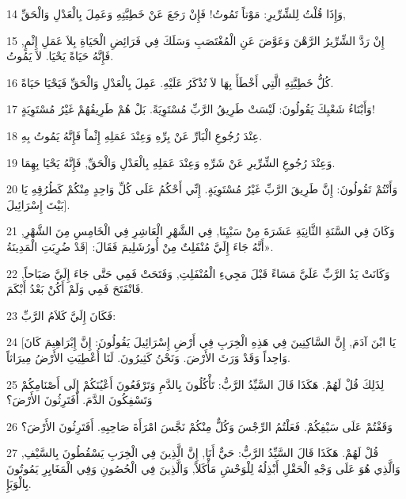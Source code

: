 \par 14 وَإِذَا قُلْتُ لِلشِّرِّيرِ: مَوْتاً تَمُوتُ! فَإِنْ رَجَعَ عَنْ خَطِيَّتِهِ وَعَمِلَ بِالْعَدْلِ وَالْحَقِّ,
\par 15 إِنْ رَدَّ الشِّرِّيرُ الرَّهْنَ وَعَوَّضَ عَنِ الْمُغْتَصَبِ وَسَلَكَ فِي فَرَائِضِ الْحَيَاةِ بِلاَ عَمَلِ إِثْمٍ, فَإِنَّهُ حَيَاةً يَحْيَا. لاَ يَمُوتُ.
\par 16 كُلُّ خَطِيَّتِهِ الَّتِي أَخْطَأَ بِهَا لاَ تُذْكَرُ عَلَيْهِ. عَمِلَ بِالْعَدْلِ وَالْحَقِّ فَيَحْيَا حَيَاةً.
\par 17 وَأَبْنَاءُ شَعْبِكَ يَقُولُونَ: لَيْسَتْ طَرِيقُ الرَّبِّ مُسْتَوِيَةً. بَلْ هُمْ طَرِيقُهُمْ غَيْرُ مُسْتَوِيَةٍ!
\par 18 عِنْدَ رُجُوعِ الْبَارِّ عَنْ بِرِّهِ وَعِنْدَ عَمَلِهِ إِثْماً فَإِنَّهُ يَمُوتُ بِهِ.
\par 19 وَعِنْدَ رُجُوعِ الشِّرِّيرِ عَنْ شَرِّهِ وَعِنْدَ عَمَلِهِ بِالْعَدْلِ وَالْحَقِّ, فَإِنَّهُ يَحْيَا بِهِمَا.
\par 20 وَأَنْتُمْ تَقُولُونَ: إِنَّ طَرِيقَ الرَّبِّ غَيْرُ مُسْتَوِيَةٍ. إِنِّي أَحْكُمُ عَلَى كُلِّ وَاحِدٍ مِنْكُمْ كَطُرُقِهِ يَا بَيْتَ إِسْرَائِيلَ].
\par 21 وَكَانَ فِي السَّنَةِ الثَّانِيَةِ عَشَرَةَ مِنْ سَبْيِنَا, فِي الشَّهْرِ الْعَاشِرِ فِي الْخَامِسِ مِنَ الشَّهْرِ, أَنَّهُ جَاءَ إِلَيَّ مُنْفَلِتٌ مِنْ أُورُشَلِيمَ فَقَالَ: [قَدْ ضُرِبَتِ الْمَدِينَةُ».
\par 22 وَكَانَتْ يَدُ الرَّبِّ عَلَيَّ مَسَاءً قَبْلَ مَجِيءِ الْمُنْفَلِتِ, وَفَتَحَتْ فَمِي حَتَّى جَاءَ إِلَيَّ صَبَاحاً, فَانْفَتَحَ فَمِي وَلَمْ أَكُنْ بَعْدُ أَبْكَمَ.
\par 23 فَكَانَ إِلَيَّ كَلاَمُ الرَّبِّ:
\par 24 [يَا ابْنَ آدَمَ, إِنَّ السَّاكِنِينَ فِي هَذِهِ الْخِرَبِ فِي أَرْضِ إِسْرَائِيلَ يَقُولُونَ: إِنَّ إِبْرَاهِيمَ كَانَ وَاحِداً وَقَدْ وَرَثَ الأَرْضَ. وَنَحْنُ كَثِيرُونَ. لَنَا أُعْطِيَتِ الأَرْضُ مِيرَاثاً.
\par 25 لِذَلِكَ قُلْ لَهُمْ. هَكَذَا قَالَ السَّيِّدُ الرَّبُّ: تَأْكُلُونَ بِالدَّمِ وَتَرْفَعُونَ أَعْيُنَكُمْ إِلَى أَصْنَامِكُمْ وَتَسْفِكُونَ الدَّمَ. أَفَتَرِثُونَ الأَرْضَ؟
\par 26 وَقَفْتُمْ عَلَى سَيْفِكُمْ. فَعَلْتُمُ الرِّجْسَ وَكُلٌّ مِنْكُمْ نَجَّسَ امْرَأَةَ صَاحِبِهِ. أَفَتَرِثُونَ الأَرْضَ؟
\par 27 قُلْ لَهُمْ. هَكَذَا قَالَ السَّيِّدُ الرَّبُّ: حَيٌّ أَنَا, إِنَّ الَّذِينَ فِي الْخِرَبِ يَسْقُطُونَ بِالسَّيْفِ, وَالَّذِي هُوَ عَلَى وَجْهِ الْحَقْلِ أَبْذِلُهُ لِلْوَحْشِ مَأْكَلاً, وَالَّذِينَ فِي الْحُصُونِ وَفِي الْمَغَايِرِ يَمُوتُونَ بِالْوَبَإِ.
